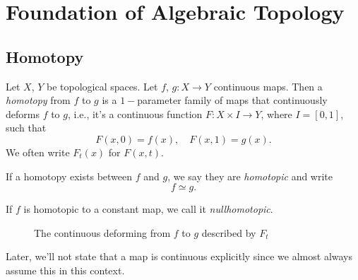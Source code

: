 \section{Foundation of Algebraic Topology}
\subsection{Homotopy}
\begin{definition}\label{def:homotopy}\label{def:homotopic}\label{def:nullhomotopic}
	Let \(X\), \(Y\) be topological spaces. Let \(f\), \(g\colon X\to Y\) continuous maps. Then a \emph{homotopy} from \(f\)
	to \(g\) is a \(1-\)parameter family of maps that continuously deforms \(f\) to \(g\), i.e., it's a continuous function
	\(F\colon X\times I\to Y\), where \(I=\left[0,1\right]\), such that
	\[
		F(x, 0) = f(x),\quad F(x, 1) = g(x).
	\]
	We often write \(F_{t}(x)\) for \(F(x, t)\).

	\par If a homotopy exists between \(f\) and \(g\), we say they are \emph{homotopic} and write
	\[
		f\simeq g.
	\]

	\par If \(f\) is homotopic to a constant map, we call it \emph{nullhomotopic}.
\end{definition}
\begin{figure}[H]
	\centering
	\caption{The continuous deforming from \(f\) to \(g\) described by \(F_t\)}
	\label{fig:def:homotopy}
\end{figure}

\begin{remark}
	Later, we'll not state that a map is continuous explicitly since we almost always assume this in this context.
\end{remark}

